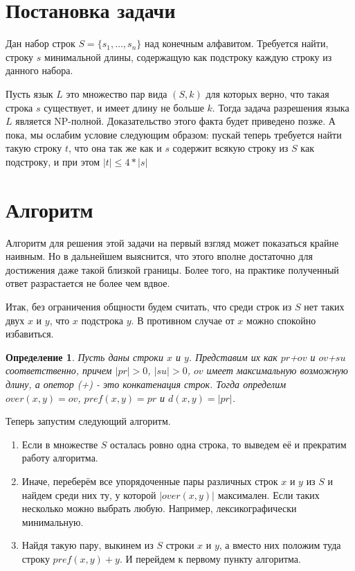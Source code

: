 \documentclass[a4paper,10pt]{article}
\title{\B{Общая надстрока наименьшей длины}}
\author{Андрей Осипов}
\newtheorem{definition}{Определение}
\begin{document}
\Russian
\maketitle

\section{Постановка задачи}
Дан набор строк $S = \{s_1,\dots,s_n\}$ над конечным алфавитом. 
Требуется найти, строку $s$ минимальной длины, содержащую как подстроку каждую строку из данного набора.

Пусть язык $L$ это множество пар вида $(S, k)$ для которых верно, что такая строка $s$ существует, и имеет длину не больше $k$.
Тогда задача разрешения языка $L$ является NP-полной.
Доказательство этого факта будет приведено позже.
А пока, мы ослабим условие следующим образом: пускай теперь требуется найти такую строку $t$, 
что она так же как и $s$ содержит всякую строку из $S$ как подстроку, и при этом $|t| \leq 4*|s|$

\section{Алгоритм}
Алгоритм для решения этой задачи на первый взгляд может показаться крайне наивным.
Но в дальнейшем выяснится, что этого вполне достаточно для достижения даже такой близкой границы.
Более того, на практике полученный ответ разрастается не более чем вдвое.

Итак, без ограничения общности будем считать, что среди строк из $S$ нет таких двух $x$ и $y$, что $x$ подстрока $y$.
В противном случае от $x$ можно спокойно избавиться.

\begin{definition}
Пусть даны строки $x$ и $y$.
Представим их как $pr$+$ov$ и $ov$+$su$ соответственно, причем $|pr|>0$, $|su|>0$, $ov$ имеет максимальную возможную длину, а опетор (+) - это конкатенация строк.
Тогда определим $over(x, y) = ov$, $pref(x, y) = pr$ и $d(x, y) = |pr|$.
\end{definition}

\noindent Теперь запустим следующий алгоритм.
\begin{enumerate}
\item Если в множестве $S$ осталась ровно одна строка, то выведем её и прекратим работу алгоритма.
\item Иначе, переберём все упорядоченные пары различных строк $x$ и $y$ из $S$ и найдем среди них ту, у которой $|over(x, y)|$ максимален.
Если таких несколько можно выбрать любую. Например, лексикографически минимальную.
\item Найдя такую пару, выкинем из $S$ строки $x$ и $y$, а вместо них положим туда строку $pref(x, y)+y$. 
И перейдем к первому пункту алгоритма.
\end{enumerate}
\end{document}
